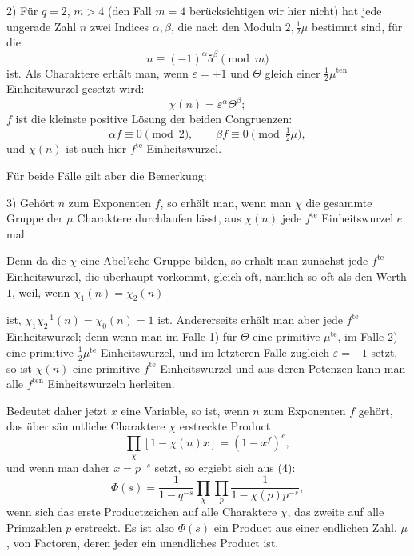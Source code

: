 \documentclass[11pt]{article}
\begin{document}
2) Für $q=2$, $m>4$ (den Fall $m=4$ berücksichtigen wir hier nicht) hat jede ungerade Zahl $n$ zwei Indices $\alpha,\beta$, die nach den Moduln $2,\frac12\mu$ bestimmt sind, für die
\begin{equation}
n\equiv(-1)^\alpha 5^\beta\pmod m
\tag{7}
\end{equation}
ist. Als Charaktere erhält man, wenn $\varepsilon=\pm1$ und $\Theta$ gleich einer $\frac12\mu^{\mathrm{ten}}$ Einheitswurzel gesetzt wird:
\begin{equation}
\chi(n)=\varepsilon^\alpha\Theta^\beta;
\tag{8}
\end{equation}
$f$ ist die kleinste positive Lösung der beiden Congruenzen:
\[
\alpha f\equiv0\pmod2,\qquad \beta f\equiv0\pmod{\tfrac12\mu},
\]
und $\chi(n)$ ist auch hier $f^{\mathrm{te}}$ Einheitswurzel.

Für beide Fälle gilt aber die Bemerkung:

3) Gehört $n$ zum Exponenten $f$, so erhält man, wenn man $\chi$ die gesammte Gruppe der $\mu$ Charaktere durchlaufen lässt, aus $\chi(n)$ jede $f^{\mathrm{te}}$ Einheitswurzel $e$ mal.

Denn da die $\chi$ eine Abel'sche Gruppe bilden, so erhält man zunächst jede $f^{\mathrm{te}}$ Einheitswurzel, die überhaupt vorkommt, gleich oft, nämlich so oft als den Werth $1$, weil, wenn $\chi_1(n)=\chi_2(n)$

ist, $\chi_1\chi_2^{-1}(n)=\chi_0(n)=1$ ist. Andererseits erhält man aber jede $f^{\mathrm{te}}$ Einheitswurzel; denn wenn man im Falle 1) für $\Theta$ eine primitive $\mu^{\mathrm{te}}$, im Falle 2) eine primitive $\frac12\mu^{\mathrm{te}}$ Einheitswurzel, und im letzteren Falle zugleich $\varepsilon=-1$ setzt, so ist $\chi(n)$ eine primitive $f^{\mathrm{te}}$ Einheitswurzel und aus deren Potenzen kann man alle $f^{\mathrm{ten}}$ Einheitswurzeln herleiten.

Bedeutet daher jetzt $x$ eine Variable, so ist, wenn $n$ zum Exponenten $f$ gehört, das über sämmtliche Charaktere $\chi$ erstreckte Product
\begin{equation}
\prod_\chi[1-\chi(n)x]=(1-x^f)^e,
\tag{9}
\end{equation}
und wenn man daher $x=p^{-s}$ setzt, so ergiebt sich aus (4):
\begin{equation}
\Phi(s)=\frac1{1-q^{-s}}\prod_\chi\prod_p\frac1{1-\chi(p)p^{-s}},
\tag{10}
\end{equation}
wenn sich das erste Productzeichen auf alle Charaktere $\chi$, das zweite auf alle Primzahlen $p$ erstreckt. Es ist also $\Phi(s)$ ein Product aus einer endlichen Zahl, $\mu$, von Factoren, deren jeder ein unendliches Product ist.
\end{document}
